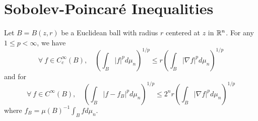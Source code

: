 \section{Sobolev-Poincar\'e Inequalities}

\begin{thm}
	Let $B = B(z,r)$ be a Euclidean ball with radius $r$ centered at $z$ in $\mathbb{R}^n$. For any $1 \leq p < \infty$, we have
	\begin{equation*}
		\forall~f\in C_c^\infty(B),\quad \left(\int_B|f|^p d \mu_n\right)^{1 / p} \leq r\left(\int_B|\nabla f|^p d \mu_n\right)^{1 / p}
	\end{equation*}
	and for
	\begin{equation*}
		\forall~f\in C^\infty(B),\quad \left(\int_B\left|f-f_B\right|^p d \mu_n\right)^{1 / p} \leq 2^n r\left(\int_B|\nabla f|^p d \mu_n\right)^{1 / p}
	\end{equation*}
	where $f_B=\mu(B)^{-1} \int_B f d \mu_n$.
\end{thm}
